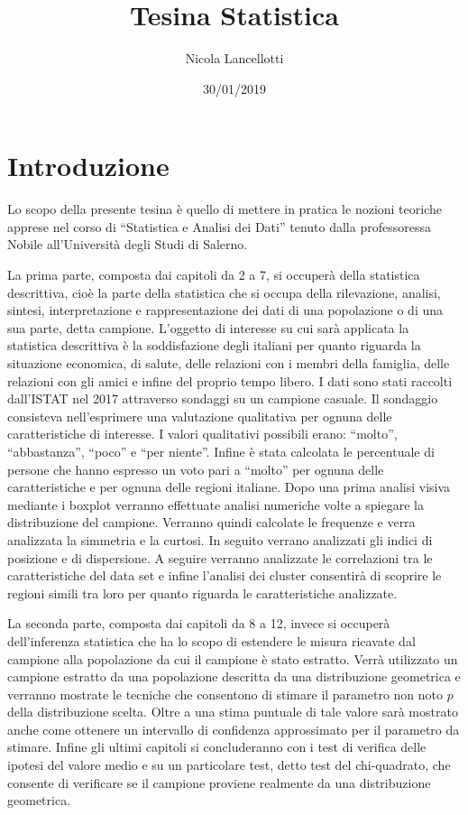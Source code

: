 \documentclass[]{book}
\title{Tesina Statistica}
\author{Nicola Lancellotti}
\date{30/01/2019}
\begin{document}
\maketitle

{
\setcounter{tocdepth}{1}
\tableofcontents
}
\chapter{Introduzione}\label{introduzione}

Lo scopo della presente tesina è quello di mettere in pratica le nozioni
teoriche apprese nel corso di ``Statistica e Analisi dei Dati''
\citep{sad} tenuto dalla professoressa Nobile all'Università degli Studi
di Salerno.

La prima parte, composta dai capitoli da 2 a 7, si occuperà della
statistica descrittiva, cioè la parte della statistica che si occupa
della rilevazione, analisi, sintesi, interpretazione e rappresentazione
dei dati di una popolazione o di una sua parte, detta campione.
L'oggetto di interesse su cui sarà applicata la statistica descrittiva è
la soddisfazione degli italiani per quanto riguarda la situazione
economica, di salute, delle relazioni con i membri della famiglia, delle
relazioni con gli amici e infine del proprio tempo libero. I dati sono
stati raccolti dall'ISTAT nel 2017 attraverso sondaggi su un campione
casuale. Il sondaggio consisteva nell'esprimere una valutazione
qualitativa per ognuna delle caratteristiche di interesse. I valori
qualitativi possibili erano: ``molto'', ``abbastanza'', ``poco'' e ``per
niente''. Infine è stata calcolata le percentuale di persone che hanno
espresso un voto pari a ``molto'' per ognuna delle caratteristiche e per
ognuna delle regioni italiane. Dopo una prima analisi visiva mediante i
boxplot verranno effettuate analisi numeriche volte a spiegare la
distribuzione del campione. Verranno quindi calcolate le frequenze e
verra analizzata la simmetria e la curtosi. In seguito verrano
analizzati gli indici di posizione e di dispersione. A seguire verranno
analizzate le correlazioni tra le caratteristiche del data set e infine
l'analisi dei cluster consentirà di scoprire le regioni simili tra loro
per quanto riguarda le caratteristiche analizzate.

La seconda parte, composta dai capitoli da 8 a 12, invece si occuperà
dell'inferenza statistica che ha lo scopo di estendere le misura
ricavate dal campione alla popolazione da cui il campione è stato
estratto. Verrà utilizzato un campione estratto da una popolazione
descritta da una distribuzione geometrica e verranno mostrate le
tecniche che consentono di stimare il parametro non noto \(p\) della
distribuzione scelta. Oltre a una stima puntuale di tale valore sarà
mostrato anche come ottenere un intervallo di confidenza approssimato
per il parametro da stimare. Infine gli ultimi capitoli si concluderanno
con i test di verifica delle ipotesi del valore medio e su un
particolare test, detto test del chi-quadrato, che consente di
verificare se il campione proviene realmente da una distribuzione
geometrica.
\end{document}

